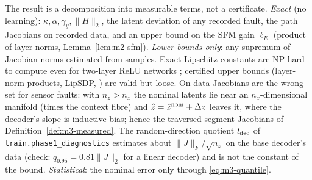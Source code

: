 \begin{remark}\label{rem:m3-cert}
The result is a decomposition into measurable terms, not a certificate. \emph{Exact} (no learning):
$\kappa,\alpha,\gamma_y,\|H\|_2$, the latent deviation of any recorded fault, the path Jacobians on
recorded data, and an upper bound on the SFM gain $\ell_E$ (product of layer norms,
Lemma~\ref{lem:m2-sfm}). \emph{Lower bounds only}: any supremum of Jacobian norms estimated from samples.
Exact Lipschitz constants are NP-hard to compute even for two-layer ReLU networks
\citep{virmaux2018lipschitz}; certified upper bounds (layer-norm products, LipSDP,
\citealp{fazlyab2019efficient}) are valid but loose. On-data Jacobians are the wrong set for sensor
faults: with $n_z>n_x$ the nominal latents lie near an $n_x$-dimensional manifold (times the context
fibre) and $\hat z=\hat z^{\rm nom}+\Delta z$ leaves it, where the decoder's slope is inductive bias; hence
the traversed-segment Jacobians of Definition~\ref{def:m3-measured}. The random-direction quotient
$l_{\rm dec}$ of \texttt{train.phase1\_diagnostics} estimates about $\|J\|_F/\sqrt{n_z}$ on the base
decoder's data (check: $q_{0.95}=0.81\|J\|_2$ for a linear decoder) and is not the constant of the
bound. \emph{Statistical}: the nominal error only through \eqref{eq:m3-quantile}.
\end{remark}

